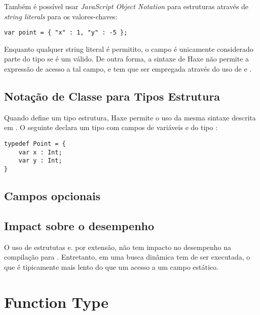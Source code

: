 Também é possível usar \emph{JavaScript Object Notation} para estruturas através de \emph{string literals}  para os valores-chaves:

\begin{lstlisting}
var point = { "x" : 1, "y" : -5 };
\end{lstlisting}
Enquanto qualquer string literal é permitito, o campo é unicamente considerado parte do tipo se é um  válido. De outra forma, a sintaxe de Haxe não permite a expressão de acesso a tal campo, e  tem que ser empregada através do uso de  e .

\subsection{Notação de Classe para Tipos Estrutura}
\label{types-structure-class-notation}

Quando define um tipo estrutura, Haxe permite o uso da mesma sintaxe descrita em . O seguinte  declara um tipo  com campos de variáveis  e  do tipo :

\begin{lstlisting}
typedef Point = {
    var x : Int;
    var y : Int;
}
\end{lstlisting}

\subsection{Campos opcionais}
\label{types-structure-optional-fields}


\subsection{Impact sobre o desempenho}
\label{types-structure-performance}

O uso de estrututas e. por extensão,  não tem impacto no desempenho na compilação para . Entretanto, em  uma busca dinâmica tem de ser executada, o que é tipicamente mais lento do que um acesso a um campo estático.




\section{Function Type}
\label{types-function}

